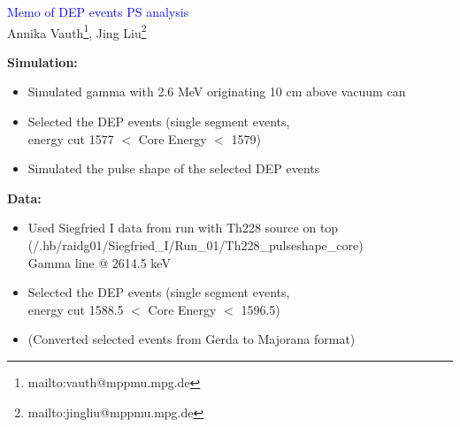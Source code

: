 \documentclass[landscape]{slides}
\begin{document}
\begin{slide}
\begin{center}
\textcolor{blue}{Memo of DEP events PS analysis}\\
Annika Vauth\footnote{mailto:vauth@mppmu.mpg.de},
Jing Liu\footnote{mailto:jingliu@mppmu.mpg.de}
\end{center}

\end{slide}


\begin{slide}

\textbf{Simulation:}

\begin{itemize}

\item Simulated gamma with 2.6 MeV originating 10 cm above vacuum can

\item Selected the DEP events (single segment events,
	\\ energy cut 1577 $<$ Core Energy $<$ 1579)

\item Simulated the pulse shape of the selected DEP events

\end{itemize}

\end{slide}

\begin{slide}

\textbf{Data:}

\begin{itemize}

\item Used Siegfried I data from run with Th228 source on top
	\\ (/.hb/raidg01/Siegfried\_I/Run\_01/Th228\_pulseshape\_core)
	\\ Gamma line @ 2614.5 keV

\item Selected the DEP events (single segment events,
	\\ energy cut 1588.5 $<$ Core Energy $<$ 1596.5)

\item (Converted selected events from Gerda to Majorana format)

\end{itemize}

\end{slide}
\end{document}
